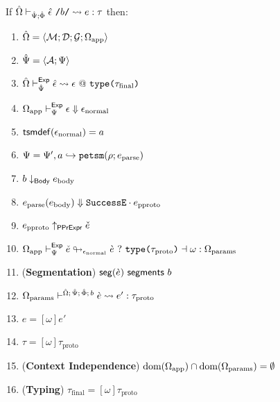\begingroup
\def\thetheorem{\ref{thm:petsm-reasoning-principles}}
\begin{theorem}
If ${\hat\Omega} \vdash_{\hat{\Psi}; \hat\Phi} {\hat\epsilon}~\texttt{/}b\texttt{/} \leadsto e : \tau$ then:
\begin{enumerate}
  \item ${\hat\Omega} = \langle \mathcal{M}; \mathcal{D}; \mathcal{G}; \Omega_\text{app} \rangle$
  \item $\hat{\Psi}=\langle \mathcal{A}; \Psi \rangle$
  \item ${\hat\Omega} \vdash_{\hat{\Psi}}^{\mathsf{Exp}} {\hat\epsilon} \leadsto \epsilon~@~\texttt{type}\texttt{(}\tau_\text{final}\texttt{)}$
  \item $\Omega_\text{app} \vdash_{\Psi}^\mathsf{Exp} \epsilon \Downarrow \epsilon_\text{normal}$
  \item $\mathsf{tsmdef}(\epsilon_\text{normal})=a$
  \item $\Psi = \Psi', a \hookrightarrow \texttt{petsm}(\rho; e_\text{parse})$
  \item $b \downarrow_\mathsf{Body} e_\text{body}$
  \item $e_\text{parse}(e_\text{body}) \Downarrow {\mathtt{SuccessE}}\cdot{e_\text{pproto}}$
  \item $e_\text{pproto} \uparrow_\mathsf{PPrExpr} \check{e}$
  \item $\Omega_\text{app} \vdash_{\Psi}^\mathsf{Exp} \check{e} \looparrowright_{\epsilon_\text{normal}} \grave{e} ~?~ \texttt{type}\texttt{(}\tau_\text{proto}\texttt{)} \dashv \omega : \Omega_\text{params}$
  \item (\textbf{Segmentation}) $\mathsf{seg}(\grave{e})~\mathsf{segments}~b$
  \item $\Omega_\text{params} \vdash^{{\hat\Omega};\,\hat{\Psi};\,\hat\Phi;\,b} \grave{e} \leadsto e' : \tau_\text{proto}$
  \item $e = [\omega]e'$
  \item $\tau = [\omega]\tau_\text{proto}$
  \item (\textbf{Context Independence}) $\text{dom}(\Omega_\text{app}) \cap \text{dom}(\Omega_\text{params}) = \emptyset$
  \item (\textbf{Typing}) $\tau_\text{final} = [\omega]\tau_\text{proto}$
\end{enumerate}
\end{theorem}
\endgroup

